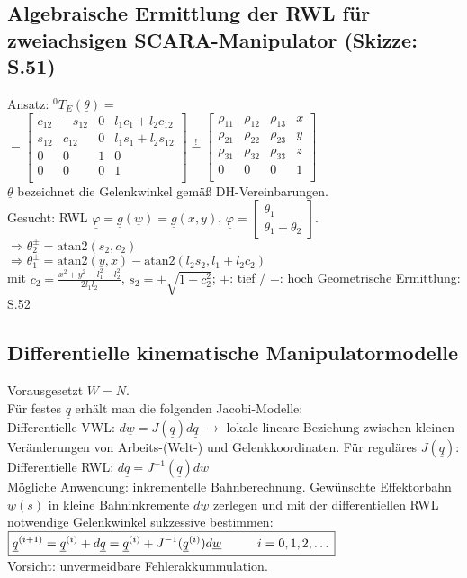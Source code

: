 \documentclass[a4paper,landscape,6pt]{article}
\newcommand{\mat}[1]{\ensuremath{\begin{bmatrix} #1 \end{bmatrix}}}				%
\newcommand{\ul}[1]{\underline{#1}}
\begin{document}
\begin{multicols}{3}
\subsection*{Algebraische Ermittlung der RWL  \footnotesize{für zweiachsigen SCARA-Manipulator (Skizze: S.51)}}
Ansatz: ${}^{0}{T}_E(\ul \theta) =$ \\ $= \mat{c_{12} & -s_{12} & 0 & l_1 c_1 + l_2 c_{12}\\
	s_{12} & c_{12} & 0 & l_1 s_1 + l_2 s_{12} \\
	0 & 0 & 1 & 0 \\
	0 & 0 & 0 & 1 \\ } \overset{!}{=} \mat{\rho_{11} & \rho_{12} & \rho_{13} & x\\
	\rho_{21} & \rho_{22} & \rho_{23} & y \\
	\rho_{31} & \rho_{32} & \rho_{33} & z \\
	0 & 0 & 0 & 1 \\ }$\\
$\ul \theta$ bezeichnet die Gelenkwinkel gemäß DH-Vereinbarungen.\\
Gesucht: RWL $\ul \varphi = \ul g(\ul w) = \ul g(x,y)$, $\ul \varphi = \mat{\theta_1 \\\theta_1 + \theta_2}$.\\
$\Rightarrow \boxed{\theta_2^{\pm} =\text{atan2}(s_2,c_2)}$\\
$\Rightarrow \boxed{\theta_1^{\pm} = \text{atan2}(y,x) - \text{atan2}(l_2 s_2, l_1 + l_2 c_2 )}$\\
mit $c_2 = \frac{x^2 + y^2 - l_1^2 - l_2^2}{2 l_1 l_2}$, $s_2 = \pm \sqrt{1-c_2^2}$; $+$: tief / $-$: hoch
Geometrische Ermittlung: S.52
\subsection*{Differentielle kinematische Manipulatormodelle}
Vorausgesetzt $W =N$.\\ Für festes $\ul q$ erhält man die folgenden Jacobi-Modelle:\\
Differentielle VWL: $\boxed{ d\ul w = J(\ul q) d\ul q}$ 
$\rightarrow$ lokale lineare Beziehung zwischen kleinen Veränderungen von Arbeits-(Welt-) und Gelenkkoordinaten. Für reguläres $J(\ul q)$:\\
Differentielle RWL: $\boxed{ d\ul q = J^{-1}(\ul q) d\ul w}$ \\

Mögliche Anwendung: inkrementelle Bahnberechnung. Gewünschte Effektorbahn $\ul w(s)$ in kleine Bahninkremente $d\ul w$ zerlegen und mit der differentiellen RWL notwendige Gelenkwinkel sukzessive bestimmen:\\
$\boxed{\ul q^{(i+1)} = \ul q^{(i)} + d \ul q = \ul q^{(i)} + J^{-1}(\ul q^{(i)}) d\ul w \tab i = 0,1,2, \dots}$\\
Vorsicht: unvermeidbare Fehlerakkummulation.\\


\end{multicols}
\end{document}
